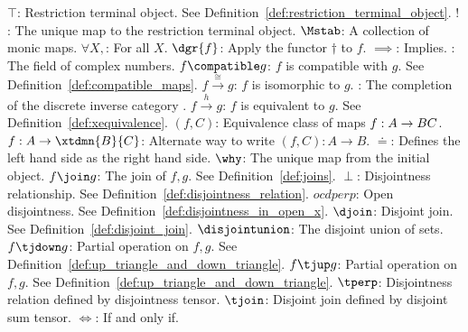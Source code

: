 \begin{tabbing}
\addsymbol \mbox{$\top$}: {Restriction terminal object. See  Definition~\ref{def:restriction_terminal_object}.}
\addsymbol \mbox{$!$}: {The unique map to the restriction terminal object.}
\addsymbol \mbox{$\Mstab$}: {A collection of monic maps.}
\addsymbol \mbox{$\forall X,$}: {For all $X$.}
\addsymbol \mbox{$\dgr{f}$}: {Apply the functor $\dagger$ to $f$.}
\addsymbol \mbox{$\implies$}: {Implies.}
\addsymbol \mbox{\complex}: {The field of complex numbers.}
\addsymbol \mbox{$f\compatible g$}: {$f$ is compatible with $g$. See  Definition~\ref{def:compatible_maps}.}
\addsymbol \mbox{$f\xrightarrow{\cong}g$}: {$f$ is isomorphic to $g$.}
\addsymbol \mbox{\Xt}: {The completion of the discrete inverse category \X.}
\addsymbol \mbox{$f\xrightarrow{h}g$}: {$f$ is equivalent to $g$. See  Definition~\ref{def:xequivalence}.}
\addsymbol \mbox{$(f,C)$}: {Equivalence class of maps $f:A\to B\*C$.}
\addsymbol \mbox{$f:A\to\xtdmn{B}{C}$}: {Alternate way to write $(f,C):A \to B$.}
\addsymbol \mbox{$\doteq$}: {Defines the left hand side as the right hand side.}
\addsymbol \mbox{$\why$}: {The unique map from the initial object.}
\addsymbol \mbox{$f\join g$}: {The join of $f,g$. See Definition~\ref{def:joins}.}
\addsymbol \mbox{$\perp$}: {Disjointness relationship. See  Definition~\ref{def:disjointness_relation}.}
\addsymbol \mbox{$ocdperp$}: {Open disjointness. See Definition~\ref{def:disjointness_in_open_x}.}
\addsymbol \mbox{$\djoin$}: {Disjoint join. See Definition~\ref{def:disjoint_join}.}
\addsymbol \mbox{$\disjointunion$}: {The disjoint union of sets.}
\addsymbol \mbox{$f\tjdown g$}: {Partial operation on $f,g$. See Definition~\ref{def:up_triangle_and_down_triangle}.}
\addsymbol \mbox{$f\tjup g$}: {Partial operation on $f,g$. See Definition~\ref{def:up_triangle_and_down_triangle}.}
\addsymbol \mbox{$\tperp$}: {Disjointness relation defined by disjointness tensor.}
\addsymbol \mbox{$\tjoin$}: {Disjoint join defined by disjoint sum tensor.}
\addsymbol \mbox{$\iff$}: {If and only if.}
\end{tabbing}

